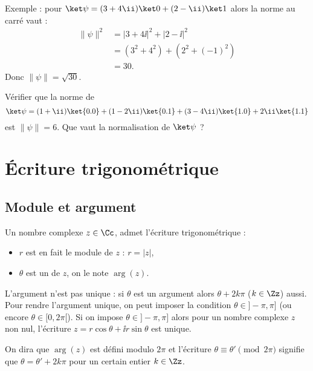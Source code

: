 \documentclass[11pt,class=report,crop=false]{standalone}
\begin{document}
Exemple : pour $\ket\psi = (3+4\ii)\ket0 + (2-\ii)\ket1$ alors la norme au carré vaut :
\begin{align*}
\| \psi \|^2 
  &= |3+4\ii|^2 + |2-\ii|^2 \\
  &= (3^2+4^2) + (2^2+(-1)^2) \\
  &= 30. 
\end{align*}
  Donc $\|\psi\| = \sqrt{30}$.

\begin{exercicecours}
Vérifier que la norme de 
$$\ket\psi = (1+\ii)\ket{0.0}  + (1-2\ii)\ket{0.1} + (3-4\ii)\ket{1.0}+2\ii\ket{1.1}$$
est $\|\psi\| = 6$.
Que vaut la normalisation de $\ket\psi$ ?
\end{exercicecours}


\section{Écriture trigonométrique}

\subsection{Module et argument}

Un nombre complexe $z\in\Cc$, admet l'écriture trigonométrique :


\begin{itemize}
  \item $r$ est en fait le module de $z$ : $r=|z|$,
  \item $\theta$ est un  de $z$, on le note $\arg(z)$.
\end{itemize}

L'argument n'est pas unique : si $\theta$ est un argument alors $\theta + 2k\pi$ ($k\in\Zz$) aussi.
Pour rendre l'argument unique, on peut imposer la condition $\theta \in ]-\pi,\pi]$ (ou encore $\theta \in [0,2\pi[$). 
Si on impose $\theta \in ]-\pi,\pi]$ alors pour un nombre complexe $z$ non nul, l'écriture
$z = r\cos\theta  + \ii r\sin\theta$ est unique.

On dira que $\arg(z)$ est \og{}défini  modulo $2\pi$\fg{} et l'écriture 
$\theta \equiv \theta' \pmod{2\pi}$ signifie que $\theta = \theta'+2k\pi$ pour un certain entier $k\in\Zz$.
  
\end{document}
